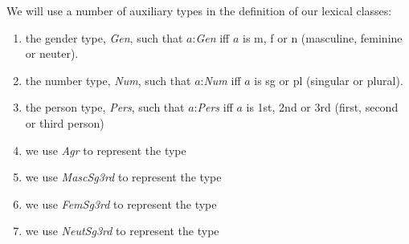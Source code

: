 We will use a number of auxiliary types in the definition of our
lexical classes:
\begin{enumerate}

\renewcommand{\labelenumi}{LTy\arabic{enumi}.} 
 
\item the gender type, \textit{Gen}, such that $a$:\textit{Gen}
  iff $a$ is m, f or n (masculine, feminine or neuter). 
 
\item the number type, \textit{Num}, such that $a$:\textit{Num} iff
  $a$ is sg or pl (singular or plural).

\item the person type, \textit{Pers}, such that $a$:\textit{Pers} iff
  $a$ is 1st, 2nd or 3rd (first, second or third person)

\item we use \textit{Agr} to represent the type
\begin{display}
\end{display}

\item we use \textit{MascSg3rd} to represent the type
\begin{display}
\end{display}

\item we use \textit{FemSg3rd} to represent the type
\begin{display}
\end{display}

\item we use \textit{NeutSg3rd} to represent the type
\begin{display}
\end{display}


\end{enumerate}
